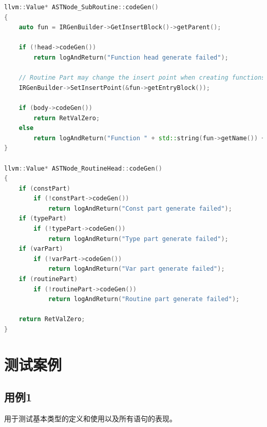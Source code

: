 \documentclass{article}
\begin{document}
\begin{lstlisting}[language=C++]
llvm::Value* ASTNode_SubRoutine::codeGen()
{
    auto fun = IRGenBuilder->GetInsertBlock()->getParent();

    if (!head->codeGen())
        return logAndReturn("Function head generate failed");

    // Routine Part may change the insert point when creating functions
    IRGenBuilder->SetInsertPoint(&fun->getEntryBlock());

    if (body->codeGen())
        return RetValZero;
    else
        return logAndReturn("Function " + std::string(fun->getName()) + "'s body has invalid stmt");
}

llvm::Value* ASTNode_RoutineHead::codeGen()
{
    if (constPart)
        if (!constPart->codeGen())
            return logAndReturn("Const part generate failed");
    if (typePart)
        if (!typePart->codeGen())
            return logAndReturn("Type part generate failed");
    if (varPart)
        if (!varPart->codeGen())
            return logAndReturn("Var part generate failed");
    if (routinePart)
        if (!routinePart->codeGen())
            return logAndReturn("Routine part generate failed");

    return RetValZero;
}
\end{lstlisting}

\newpage
\section{测试案例}
\subsection{用例1}
\par 用于测试基本类型的定义和使用以及所有语句的表现。
\end{document}
